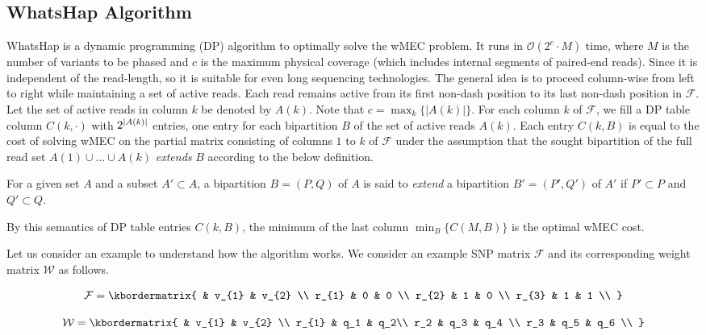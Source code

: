 \subsection{WhatsHap Algorithm}\label{sec:algorithm}
WhatsHap \citep{Patterson2015} is a dynamic programming (DP) algorithm to optimally solve the wMEC problem.
It runs in $\mathcal{O}(2^c\cdot M)$ time, where $M$ is the number of variants to be phased and $c$ is the maximum physical coverage (which includes internal segments of paired-end reads).
Since it is independent of the read-length, so it is suitable for even long sequencing technologies.
The general idea is to proceed column-wise from left to right while maintaining a set of active reads.
Each read remains active from its first non-dash position to its last non-dash position in $\mathcal{F}$.
Let the set of active reads in column $k$ be denoted by $A(k)$.
Note that $c=\max_{k}\{|A(k)|\}$.
For each column $k$ of $\mathcal{F}$, we fill a DP table column $C(k,\cdot)$ with $2^{\left\lvert A(k) \right\rvert}$ entries, one entry for each bipartition $B$ of the set of active reads $A(k)$.
Each entry $C(k,B)$ is equal to the cost of solving wMEC on the partial matrix consisting of columns $1$ to $k$ of $\mathcal{F}$ under the assumption that the sought bipartition of the full read set $A(1)\cup\ldots\cup A(k)$ \emph{extends} $B$ according to the below definition.
\begin{definition}
For a given set $A$ and a subset $A'\subset A$, a bipartition $B=(P,Q)$ of $A$ is said to \emph{extend} a bipartition $B'=(P',Q')$ of $A'$ if $P'\subset P$ and $Q'\subset Q$.
\label{def:bipartite-extend}
\end{definition}
By this semantics of DP table entries $C(k,B)$, the minimum of the last column $\min_B\{C(M,B)\}$ is the optimal wMEC cost.

Let us consider an example to understand how the algorithm works. We consider an example SNP matrix $\mathcal{F}$ and its corresponding weight matrix $\mathcal{W}$ as follows.

\begin{equation}\label{eq:snp_matrix}
  \mathcal{F}  = \kbordermatrix{
     & v_{1}       & v_{2}  \\
    r_{1}       & 0 & 0 \\
    r_{2}       & 1 & 0 \\
    r_{3}       & 1 & 1 \\
  }
\end{equation}

\begin{equation}\label{eq:snp_weight_matrix}
  \mathcal{W}  = \kbordermatrix{
     & v_{1}       & v_{2}  \\
    r_{1}       & q_1 &  q_2\\
    r_2 & q_3 & q_4 \\
    r_3 & q_5 & q_6 \\
  }
\end{equation}

